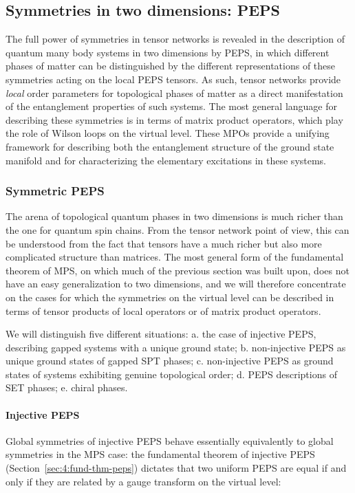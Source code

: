 \documentclass[rmp,aps,reprint,superscriptaddress,nobalancelastpage]{revtex4-1}
\begin{document}
    \subsection{Symmetries in two dimensions: PEPS\label{sec:3:2D}}

    The full power of symmetries in tensor networks is revealed in the description of quantum many body systems in two dimensions by PEPS, in which different  phases of matter can be distinguished by the different representations of these symmetries acting on  the local PEPS tensors. As such, tensor networks provide \emph{local} order parameters for topological phases of matter as a direct manifestation of the entanglement properties of such systems. The most general language for describing these symmetries is in terms of matrix product operators, which play the role of Wilson loops on the virtual level. These MPOs provide a unifying framework for describing both the entanglement structure of the ground state manifold and for characterizing the elementary excitations in these systems.

    \subsubsection{Symmetric PEPS \label{sec:3:MPO-injective}\label{sec:3:2D-SPT}}

    The arena of topological quantum phases in two dimensions is much richer than the one for quantum spin chains. From the tensor network point of view, this can be understood from the fact that tensors have a much richer but also more complicated structure than matrices. The most general form of the fundamental theorem of MPS, on which much of the previous section was built upon, does not have an easy generalization to two dimensions, and we will therefore concentrate on the cases for which the symmetries on the virtual level can be described in terms of tensor products of local operators or of matrix product operators.

    We will distinguish five different situations: a. the case of injective PEPS, describing gapped systems with a unique ground state; b. non-injective PEPS as unique ground states of gapped SPT phases; c. non-injective PEPS as ground states of systems exhibiting genuine topological order; d. PEPS descriptions of SET phases; e. chiral phases.


    \paragraph{Injective PEPS}
    Global symmetries of injective PEPS behave essentially equivalently to global symmetries in the MPS case: the fundamental theorem of injective PEPS (Section~\ref{sec:4:fund-thm-peps}) dictates that two uniform PEPS are equal if and only if they are related by a gauge transform on the virtual level:
\end{document}
